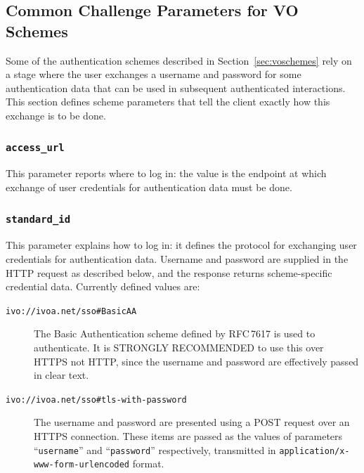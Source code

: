 \documentclass[11pt,a4paper]{ivoa}
\newcommand{\rfc}[1]{RFC\,#1}
\begin{document}
\subsection{Common Challenge Parameters for VO Schemes}
\label{sec:common-params}

Some of the authentication schemes described in Section~\ref{sec:voschemes}
rely on a stage where the user exchanges 
a username and password
for some authentication data that can be used in subsequent authenticated
interactions.
This section defines scheme parameters that
tell the client exactly how this exchange is to be done.

\subsubsection{\mbox{\tt access\_url}}
\label{sec:access-url}

This parameter reports where to log in:
the value is the endpoint at which
exchange of user credentials for authentication data
must be done.

\subsubsection{\mbox{\tt standard\_id}}
\label{sec:standard-id}

This parameter explains how to log in:
it defines the protocol for exchanging user credentials
for authentication data.
Username and password are supplied in the HTTP request as described below,
and the response returns scheme-specific credential data.
Currently defined values are:

\begin{description}
  \item[{\tt ivo://ivoa.net/sso\#BasicAA}]
        The Basic Authentication scheme defined by \rfc{7617} is used to
        authenticate.
        It is STRONGLY RECOMMENDED to use this over HTTPS not HTTP,
        since the username and password are effectively passed in clear text.
  \item[{\tt ivo://ivoa.net/sso\#tls-with-password}]
        The username and password are presented using a POST request
        over an HTTPS connection.
        These items are passed as the values of parameters
        ``{\tt username}'' and ``{\tt password}'' respectively,
        transmitted in {\tt application/x-www-form-urlencoded} format.
\end{description}
\end{document}
